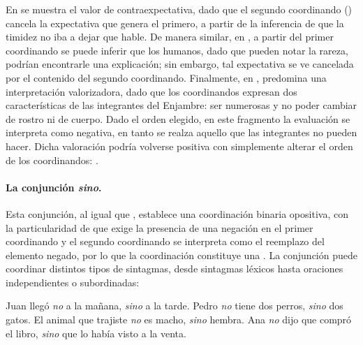 En  se muestra el valor de contraexpectativa, dado que el
segundo coordinando () cancela la
expectativa que genera el primero, a partir de la inferencia de que la timidez
no iba a dejar que hable. De manera similar, en , a partir
del primer coordinando se puede inferir que los humanos, dado que pueden notar la
rareza, podrían encontrarle una explicación; sin embargo, tal expectativa se ve
cancelada por el contenido del segundo coordinando. Finalmente, en
, predomina una interpretación valorizadora, dado que los
coordinandos expresan dos características de las integrantes del Enjambre: ser
numerosas y no poder cambiar de rostro ni de cuerpo. Dado el orden elegido, en
este fragmento la evaluación se interpreta como negativa, en tanto se realza
aquello que las integrantes no pueden hacer. Dicha valoración podría volverse
positiva con simplemente alterar el orden de los coordinandos: .

\paragraph{La conjunción \textit{sino}.}\label{sec:12-sino}
Esta conjunción, al igual que , establece una coordinación binaria
opositiva, con la particularidad de que exige la presencia de una negación en el
primer coordinando y el segundo coordinando se interpreta como el reemplazo del
elemento negado, por lo que la coordinación constituye una . La conjunción  puede coordinar distintos tipos de
sintagmas, desde sintagmas léxicos hasta oraciones independientes o
subordinadas:

\begin{exe}
  \ex\label{ex:12-sino}
    \begin{xlist}
      \ex Juan llegó \textit{no} a la mañana, \textit{sino} a la tarde.
      \ex Pedro \textit{no} tiene dos perros, \textit{sino} dos gatos.
      \ex El animal que trajiste \textit{no} es macho, \textit{sino} hembra.
      \ex Ana \textit{no} dijo que compró el libro, \textit{sino} que lo había
          visto a la venta.
    \end{xlist}
\end{exe}

